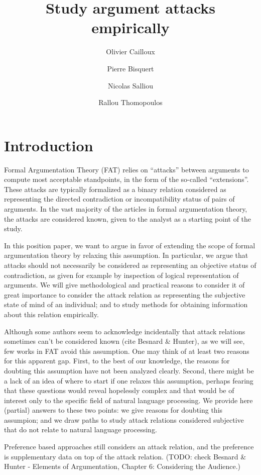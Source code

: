 \documentclass[version=3.21, pagesize, twoside=off, bibliography=totoc, DIV=calc, fontsize=12pt, a4paper, french, english]{scrartcl}
\title{Study argument attacks empirically}
\author{Olivier Cailloux}
\affil{Université Paris-Dauphine, PSL Research University, CNRS, LAMSADE, 75016 PARIS, FRANCE\\
	\href{mailto:olivier.cailloux@dauphine.fr}{olivier.cailloux@dauphine.fr}
}
\author{Pierre Bisquert}
\affil{Affiliation}
\author{Nicolas Salliou}
\affil{Affiliation}
\author{Rallou Thomopoulos}
\affil{IATE, Univ Montpellier, INRAE, Institut Agro, MONTPELLIER, FRANCE\\
	\href{mailto:rallou.thomopoulos@inrae.fr}{rallou.thomopoulos@inrae.fr}
}
\begin{document}
\maketitle

\section{Introduction}
\label{sec:intro}
Formal Argumentation Theory (FAT) \cite{Dung95} relies on “attacks” between arguments to compute most acceptable standpoints, in the form of the so-called “extensions”. These attacks are typically formalized as a binary relation considered as representing the directed contradiction or incompatibility status of pairs of arguments. In the vast majority of the articles in formal argumentation theory, the attacks are considered known, given to the analyst as a starting point of the study. 

In this position paper, we want to argue in favor of extending the scope of formal argumentation theory by relaxing this assumption. In particular, we argue that attacks should not necessarily be considered as representing an objective status of contradiction, as given for example by inspection of logical representation of arguments. We will give methodological and practical reasons to consider it of great importance to consider the attack relation as representing the subjective state of mind of an individual; and to study methods for obtaining information about this relation empirically.

Although some authors seem to acknowledge incidentally that attack relations sometimes can’t be considered known (cite Besnard \& Hunter), as we will see, few works in FAT avoid this assumption. One may think of at least two reasons for this apparent gap. First, to the best of our knowledge, the reasons for doubting this assumption have not been analyzed clearly. Second, there might be a lack of an idea of where to start if one relaxes this assumption, perhaps fearing that these questions would reveal hopelessly complex and that would be of interest only to the specific field of natural language processing. We provide here (partial) answers to these two points: we give reasons for doubting this assumpion; and we draw paths to study attack relations considered subjective that do not relate to natural language processing.

Preference based approaches still considers an attack relation, and the preference is supplementary data on top of the attack relation. (TODO: check Besnard \& Hunter - Elements of Argumentation, Chapter 6: Considering the Audience.) 
\end{document}
